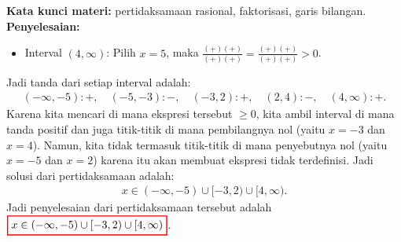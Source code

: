 \documentclass[10pt,openany,a4paper]{article}
\theoremstyle{definition}
\theoremstyle{definition}
\theoremstyle{plain}
\newenvironment{jawab}[2][tes]{
\textbf{Kata kunci materi:} #1.\\
\textbf{Penyelesaian:} #2
}{}
\begin{document}
\begin{enumerate}
\begin{jawab}[pertidaksamaan rasional, faktorisasi, garis bilangan]
{\begin{itemize}
                    \item Interval $(4, \infty)$: Pilih $x=5$, maka $\frac{(+)(+)}{(+)(+)} = \frac{(+)(+)}{(+)(+)} > 0$.
                \end{itemize}
                Jadi tanda dari setiap interval adalah:
                \begin{align*}
                    (-\infty, -5): +, \quad (-5, -3): -, \quad (-3, 2): +, \quad (2, 4): -, \quad (4, \infty): +.
                \end{align*}
                Karena kita mencari di mana ekspresi tersebut $\geq 0$, kita ambil interval di mana tanda positif dan juga titik-titik di mana pembilangnya nol (yaitu $x=-3$ dan $x=4$). Namun, kita tidak termasuk titik-titik di mana penyebutnya nol (yaitu $x=-5$ dan $x=2$) karena itu akan membuat ekspresi tidak terdefinisi. Jadi solusi dari pertidaksamaan adalah:
                \begin{align*}
                    x \in (-\infty, -5) \cup [-3, 2) \cup [4, \infty).
                \end{align*}
                Jadi penyelesaian dari pertidaksamaan tersebut adalah $\colorlet{oldcolor}{.}
        \color{red}
        \setlength{\fboxrule}{1pt} \boxed{\color{oldcolor}x \in (-\infty, -5) \cup [-3, 2) \cup [4, \infty)}\color{oldcolor}$.
            }
                

\end{jawab}
\end{enumerate}
\end{document}
